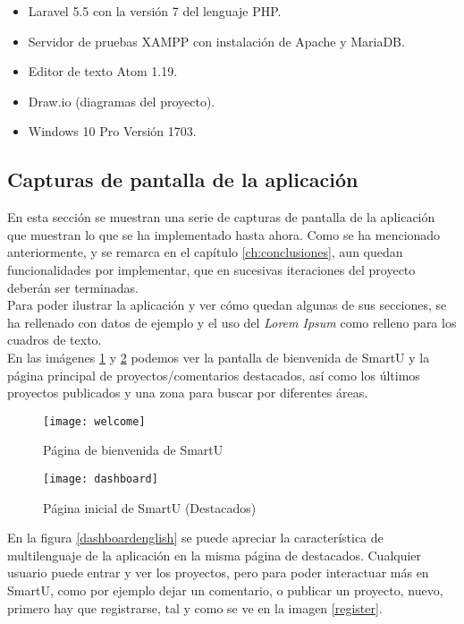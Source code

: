 \begin{itemize}
    \item Laravel 5.5 con la versión 7 del lenguaje PHP.
    \item Servidor de pruebas XAMPP con instalación de Apache y MariaDB.
    \item Editor de texto Atom 1.19.
    \item Draw.io (diagramas del proyecto).
    \item Windows 10 Pro Versión 1703.
\end{itemize}

\subsection{Capturas de pantalla de la aplicación}
En esta sección se muestran una serie de capturas de pantalla de la aplicación que muestran lo que se ha implementado hasta ahora. Como se ha mencionado anteriormente, y se remarca en el capítulo \ref{ch:conclusiones}, aun quedan funcionalidades por implementar, que en sucesivas iteraciones del proyecto deberán ser terminadas.\\

Para poder ilustrar la aplicación y ver cómo quedan algunas de sus secciones, se ha rellenado con datos de ejemplo y el uso del \textit{Lorem Ipsum} como relleno para los cuadros de texto.\\

En las imágenes \ref{welcome} y \ref{dashboard} podemos ver la pantalla de bienvenida de SmartU y la página principal de proyectos/comentarios destacados, así como los últimos proyectos publicados y una zona para buscar por diferentes áreas.\\

\begin{figure}
    \centering
    \texttt{[image: welcome]}
    \caption{Página de bienvenida de SmartU}
    \label{welcome}
\end{figure}

\begin{figure}
    \centering
    \texttt{[image: dashboard]}
    \caption{Página inicial de SmartU (Destacados)}
    \label{dashboard}
\end{figure}

En la figura \ref{dashboardenglish} se puede apreciar la característica de multilenguaje de la aplicación en la misma página de destacados. Cualquier usuario puede entrar y ver los proyectos, pero para poder interactuar más en SmartU, como por ejemplo dejar un comentario, o publicar un proyecto, nuevo, primero hay que registrarse, tal y como se ve en la imagen \ref{register}.\\

